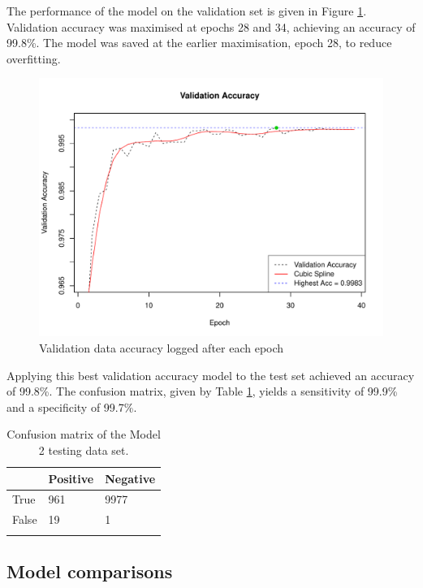 The performance of the model on the validation set is given in Figure \ref{results-valid-acc5-fig}. Validation accuracy was maximised at epochs 28 and 34, achieving an accuracy of 99.8\%. The model was saved at the earlier maximisation, epoch 28, to reduce overfitting.

\begin{figure}[ht]
	\centering
	\includegraphics[width=\textwidth]{Images/7_valid_acc5.pdf}
	\caption{\small{Validation data accuracy logged after each epoch}}
	\label{results-valid-acc5-fig}
\end{figure}

Applying this best validation accuracy model to the test set achieved an accuracy of 99.8\%. The confusion matrix, given by Table \ref{results-confmat5-tab}, yields a sensitivity of 99.9\% and a specificity of 99.7\%.

\begin{table}[ht]
	\centering
	\begin{tabular}{@{}lll@{}}
	\toprule[1.5pt]
	& Positive & Negative\\
	\midrule
	True & 961 & 9977\\
	False & 19 & 1\\
	\bottomrule[1.5pt]\\
	\end{tabular}
	\caption{\small{Confusion matrix of the Model 2 testing data set.}}
	\label{results-confmat5-tab}
\end{table}

\subsection*{Model comparisons}

